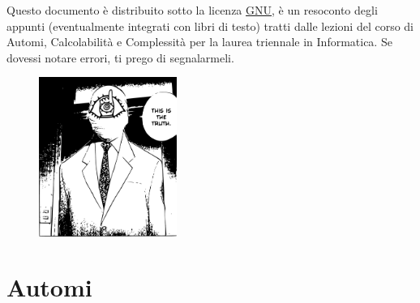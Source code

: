 \documentclass[10pt, letterpaper]{report}
\begin{document}
\newpage
\pagecolor{cartaRiciclata}%
\Large
Questo documento è distribuito sotto la licenza 
\color{blue}\href{https://www.gnu.org/licenses/fdl-1.3.txt}{GNU}\color{black},  
è un resoconto degli appunti (eventualmente integrati con libri di testo) tratti dalle lezioni del corso di Automi, Calcolabilità e Complessità
\hphantom{a}per la laurea 
triennale in Informatica. Se dovessi notare errori, ti prego di segnalarmeli.
\vfill
\begin{figure}[h!]
    \raggedright
    \includegraphics[width=0.4\textwidth,right ]{../../preamble/tomodachi.pdf} 
\end{figure}
\newpage %
\normalsize
\tableofcontents 
\newpage

\fancyhf{}
\fancyhead[L]{\nouppercase{\leftmark}}
\fancyfoot[C]{\thepage}


\chapter{Automi}
\end{document}
